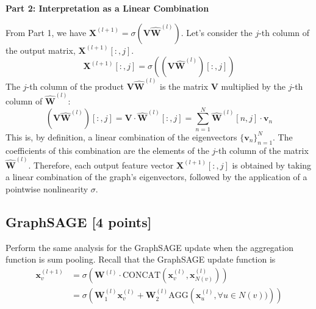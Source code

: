 \documentclass{article}
\numberwithin{figure}{section}
\begin{document}
{	\vspace{1em}
	\textbf{Part 2: Interpretation as a Linear Combination}
	
	From Part 1, we have $\mathbf{X}^{(l+1)} = \sigma(\mathbf{V}\hat{\mathbf{W}}^{(l)})$. Let's consider the $j$-th column of the output matrix, $\mathbf{X}^{(l+1)}[:,j]$.
	\[ \mathbf{X}^{(l+1)}[:,j] = \sigma\left( (\mathbf{V}\hat{\mathbf{W}}^{(l)})[:,j] \right) \]
	The $j$-th column of the product $\mathbf{V}\hat{\mathbf{W}}^{(l)}$ is the matrix $\mathbf{V}$ multiplied by the $j$-th column of $\hat{\mathbf{W}}^{(l)}$:
	\[ (\mathbf{V}\hat{\mathbf{W}}^{(l)})[:,j] = \mathbf{V} \cdot \hat{\mathbf{W}}^{(l)}[:,j] = \sum_{n=1}^{N} \hat{\mathbf{W}}^{(l)}[n,j] \cdot \mathbf{v}_n \]
	This is, by definition, a linear combination of the eigenvectors $\{\mathbf{v}_n\}_{n=1}^N$. The coefficients of this combination are the elements of the $j$-th column of the matrix $\hat{\mathbf{W}}^{(l)}$.
	Therefore, each output feature vector $\mathbf{X}^{(l+1)}[:,j]$ is obtained by taking a linear combination of the graph's eigenvectors, followed by the application of a pointwise nonlinearity $\sigma$.
}

\subsection{GraphSAGE [4 points]}
Perform the same analysis for the GraphSAGE update when the aggregation function is sum pooling. Recall that the GraphSAGE update function is
\begin{align*}
    \mathbf{x}_v^{(l+1)} &= \sigma \left(\mathbf{W}^{(l)} \cdot \mathrm{CONCAT}\left(\mathbf{x}_v^{(l)}, \mathbf{x}_{N(v)}^{(l)}\right) \right) \\
    &= \sigma \left(\mathbf{W}_1^{(l)} \mathbf{x}_v^{(l)} + \mathbf{W}_2^{(l)} \mathrm{AGG}\left(\mathbf{x}_u^{(l)}, \forall u \in N(v))\right) \right)
\end{align*}
\end{document}
